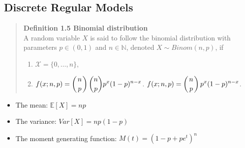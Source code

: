 \documentclass{article}
\begin{document}
\subsection{Discrete Regular Models}
\label{sec-1-1}
\begin{quote}
\textbf{Definition 1.5 Binomial distribution}\\
A random variable $X$ is said to follow the binomial distribution with parameters $p \in (0,1)$ and $n \in \mathbb{N}$, denoted $X \sim Binom(n,p)$, if

\begin{enumerate}
\item $\mathcal{X} = \{0, \ldots ,n\}$,
\item $\displaystyle f(x;n,p) = \left( n \atop p\right) \binom{n}{p}p^{x}(1-p)^{n-x}$. $\displaystyle f(x;n,p) = \left( n \atop p\right) p^{x}(1-p)^{n-x}$.
\end{enumerate}
\end{quote}

\begin{itemize}
\item The mean:  $\mathbb{E}[X] = np$
\item The variance:  $Var[X] = np(1-p)$
\item The moment generating function:  $M(t) = (1- p + pe^{t})^{n}$
\end{itemize}
\end{document}
